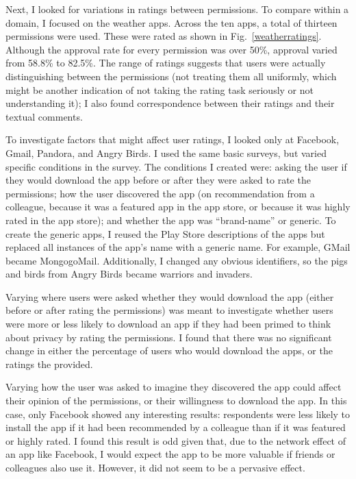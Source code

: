 \documentclass[11pt]{article}
\begin{document}
Next, I looked for variations in ratings between permissions. To
compare within a domain, I focused on the weather apps. Across the
ten apps, a total of thirteen permissions were used. These were rated
as shown in Fig.~\ref{weatherratings}.  Although the approval rate for
every permission was over 50\%, approval varied from 58.8\% to
82.5\%. The range of ratings suggests that users were actually
distinguishing between the permissions (not treating them all
uniformly, which might be another indication of not taking the rating
task seriously or not understanding it); I also found correspondence
between their ratings and their textual comments.

To investigate factors that might affect user ratings, I looked only at Facebook, Gmail,
Pandora, and Angry Birds.  I used the same basic surveys, but
varied specific conditions in the survey. The conditions I created
were: asking the user if they would download the app before or after
they were asked to rate the permissions; how the user discovered the
app (on recommendation from a colleague, because it was a featured app in
the app store, or because it was highly rated in the app store); and
whether the app was ``brand-name'' or generic. To create the generic
apps, I reused the Play Store descriptions of the apps but replaced all
instances of the app's name with a generic name. For example, GMail
became MongogoMail.  Additionally, I changed any obvious identifiers,
so the pigs and birds from Angry Birds became warriors and invaders.

Varying where users were asked whether they would download the app 
(either before or after rating the permissions) was
meant to investigate whether users were more or less likely to
download an app if they had been primed to think about privacy by
rating the permissions. I found that there was no significant change
in either the percentage of users who would download the apps, or the
ratings the provided.

Varying how the user was asked to imagine they discovered the app
could affect their opinion of the permissions, or their willingness to
download the app. In this case, only Facebook showed any interesting
results: respondents were less likely to install the app if it
had been recommended by a colleague than if it was featured or highly
rated. I found this result is odd given that, due to the network
effect of an app like Facebook, I would expect the app to be more
valuable if friends or colleagues also use it. However, it did not
seem to be a pervasive effect.
\end{document}
